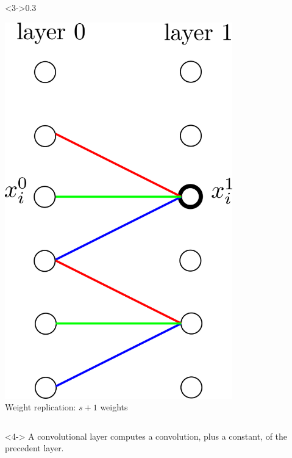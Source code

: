 \documentclass[xcolor=pdftex,dvipsnames,table,mathserif]{beamer}
\begin{document}
{\begin{columns}
  \begin{column}<3->{0.3\textwidth}
    \begin{center}
      \includegraphics[width=0.74\textwidth]{convolutional_layer.png}
      \\Weight replication: $s+1$ weights
    \end{center}
  \end{column}

\end{columns}

\begin{block}<4->{}
  A convolutional layer computes a convolution, plus a constant, of the precedent layer.
\end{block}


}
\end{document}
